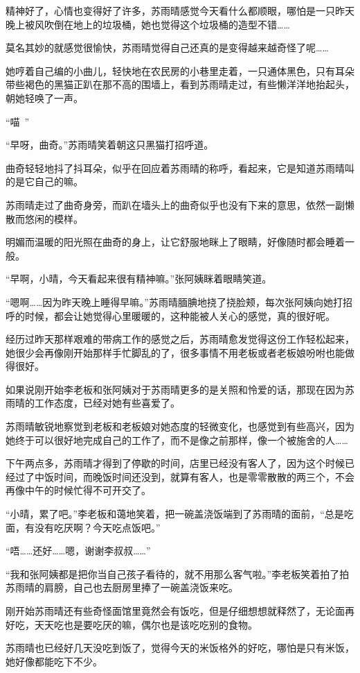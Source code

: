 精神好了，心情也变得好了许多，苏雨晴感觉今天看什么都顺眼，哪怕是一只昨天晚上被风吹倒在地上的垃圾桶，她也觉得这个垃圾桶的造型不错……

莫名其妙的就感觉很愉快，苏雨晴觉得自己还真的是变得越来越奇怪了呢……

她哼着自己编的小曲儿，轻快地在农民房的小巷里走着，一只通体黑色，只有耳朵带些褐色的黑猫正趴在那不高的围墙上，看到苏雨晴走过，有些懒洋洋地抬起头，朝她轻唤了一声。

“喵~”

“早呀，曲奇。”苏雨晴笑着朝这只黑猫打招呼道。

曲奇轻轻地抖了抖耳朵，似乎在回应着苏雨晴的称呼，看起来，它是知道苏雨晴叫的是它自己的嘛。

苏雨晴走过了曲奇身旁，而趴在墙头上的曲奇似乎也没有下来的意思，依然一副懒散而悠闲的模样。

明媚而温暖的阳光照在曲奇的身上，让它舒服地眯上了眼睛，好像随时都会睡着一般。

“早啊，小晴，今天看起来很有精神嘛。”张阿姨眯着眼睛笑道。

“嗯啊……因为昨天晚上睡得早嘛。”苏雨晴腼腆地挠了挠脸颊，每次张阿姨向她打招呼的时候，都会让她觉得心里暖暖的，这种能被人关心的感觉，真的很好呢。

经历过昨天那样艰难的带病工作的感觉之后，苏雨晴愈发觉得这份工作轻松起来，她很少会再像刚开始那样手忙脚乱的了，很多事情不用老板或者老板娘吩咐也能做得很好。

如果说刚开始李老板和张阿姨对于苏雨晴更多的是关照和怜爱的话，那现在因为苏雨晴的工作态度，已经对她有些喜爱了。

苏雨晴敏锐地察觉到老板和老板娘对她态度的轻微变化，也感觉到有些高兴，因为她终于可以很好地完成自己的工作了，而不是像之前那样，像一个被施舍的人……

下午两点多，苏雨晴才得到了停歇的时间，店里已经没有客人了，因为这个时候已经过了中饭时间，而晚饭时间还没到，就算有客人，也是零零散散的两三个，不会再像中午的时候忙得不可开交了。

“小晴，累了吧。”李老板和蔼地笑着，把一碗盖浇饭端到了苏雨晴的面前，“总是吃面，有没有吃厌啊？今天吃点饭吧。”

“唔……还好……嗯，谢谢李叔叔……”

“我和张阿姨都是把你当自己孩子看待的，就不用那么客气啦。”李老板笑着拍了拍苏雨晴的肩膀，自己也去厨房里捧了一碗盖浇饭来吃。

刚开始苏雨晴还有些奇怪面馆里竟然会有饭吃，但是仔细想想就释然了，无论面再好吃，天天吃也是要吃厌的嘛，偶尔也是该吃吃别的食物。

苏雨晴也已经好几天没吃到饭了，觉得今天的米饭格外的好吃，哪怕是只有米饭，她好像都能吃下不少。

